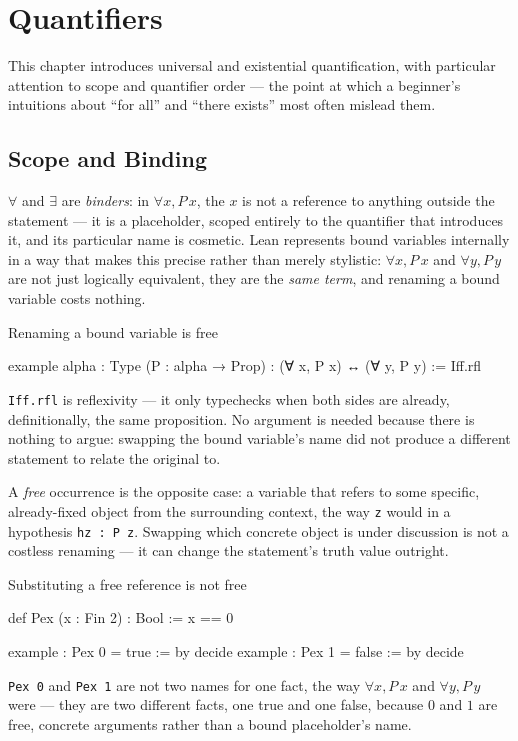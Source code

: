 \chapter{Quantifiers}
\label{ch:quantifiers}

This chapter introduces universal and existential quantification,
with particular attention to scope and quantifier order — the point
at which a beginner's intuitions about ``for all'' and ``there
exists'' most often mislead them.

\section{Scope and Binding}

$\forall$ and $\exists$ are \emph{binders}: in $\forall x, P\,x$, the
$x$ is not a reference to anything outside the statement — it is a
placeholder, scoped entirely to the quantifier that introduces it,
and its particular name is cosmetic. Lean represents bound variables
internally in a way that makes this precise rather than merely
stylistic: $\forall x, P\,x$ and $\forall y, P\,y$ are not just
logically equivalent, they are the \emph{same term}, and renaming a
bound variable costs nothing.

\begin{experiment}{Renaming a bound variable is free}
\begin{lean}
example {alpha : Type} (P : alpha → Prop) :
    (∀ x, P x) ↔ (∀ y, P y) := Iff.rfl
\end{lean}
\texttt{Iff.rfl} is reflexivity — it only typechecks when both sides
are already, definitionally, the same proposition. No argument is
needed because there is nothing to argue: swapping the bound
variable's name did not produce a different statement to relate the
original to.
\end{experiment}

A \emph{free} occurrence is the opposite case: a variable that
refers to some specific, already-fixed object from the surrounding
context, the way \texttt{z} would in a hypothesis \texttt{hz : P z}.
Swapping which concrete object is under discussion is not a costless
renaming — it can change the statement's truth value outright.

\begin{countermodel}{Substituting a free reference is not free}
\begin{lean}
def Pex (x : Fin 2) : Bool := x == 0

example : Pex 0 = true := by decide
example : Pex 1 = false := by decide
\end{lean}
\texttt{Pex 0} and \texttt{Pex 1} are not two names for one fact,
the way $\forall x, P\,x$ and $\forall y, P\,y$ were — they are two
different facts, one true and one false, because $0$ and $1$ are
free, concrete arguments rather than a bound placeholder's name.
\end{countermodel}

